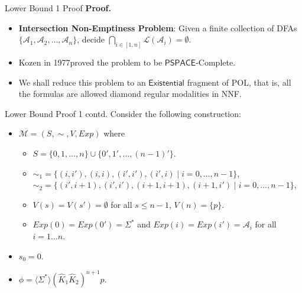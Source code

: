 \documentclass{beamer}
\newcommand\ldiaarg[1]{\langle#1\rangle}
\newcommand{\M}{\mathcal{M}}
\newcommand{\LL}{\mathcal{L}} %
\newcommand{\existential}{\mathsf{Existential}}
\newcommand{\PSPACE}{\mathsf{PSPACE}}
\newcommand{\automaton}{\mathcal A}
\newcommand{\set}[1]{\{#1\}}
\newcommand{\suchthat}{\mid}
\begin{document}
\begin{frame}{Lower Bound 1 Proof}
    \textbf{Proof. }
    \begin{itemize}
        \item<1-> \textbf{Intersection Non-Emptiness Problem}: Given a finite collection of DFAs $\{\automaton_1, \automaton_2,\ldots,\automaton_n\}$, decide $\bigcap_{i\in [1,n]}\LL(\automaton_i) = \emptyset$.
        \item<2-> Kozen in 1977\footnotemark proved the problem to be $\PSPACE$-Complete.
        \item<3-> We shall reduce this problem to an $\existential$ fragment of POL, that is, all the formulas are allowed diamond regular modalities in NNF.
    \end{itemize}
\end{frame}

\begin{frame}{Lower Bound Proof 1 contd.}
Consider the following construction:
    \begin{itemize}
        \item<1-> $\M = (S, \sim, V, Exp)$ where 
    \begin{itemize}
    	\item<2->     $S = \set{0,1, \dots, n} \cup \set{0', 1', \dots, (n-1)'}$.
    	\item<3-> $\sim_1 = \set{(i, i'), (i, i), (i', i'), (i', i)  \suchthat i=0, \dots, n-1}$,
    	$\sim_2 = \set{(i', i+1), (i', i'), (i+1, i+1), (i+1, i') \suchthat i=0, \dots, n-1}$,
    	\item<4-> $V(s) = V(s') = \emptyset$ for all $s \leq n-1$, $V(n) = \set{p}$.
    	\item<5->     $Exp(0) = Exp(0') = \Sigma^*$ and $Exp(i) = Exp(i') = \automaton_i$ for all $i=1\dots n$.
    \end{itemize}
    \item<6-> $s_0 = 0$.
    \item<7-> $\phi = \ldiaarg{\Sigma^*} (\hat K_1\hat K_2)^{n+1} p$.
    \end{itemize}
\end{frame}
\end{document}
